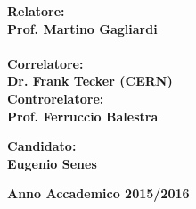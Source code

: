\begin{titlepage}
\noindent
\begin{minipage}[t]{0.47\textwidth}
{\large{\bf Relatore:\\
Prof. Martino Gagliardi}}\\
\vspace{4mm}
\\
{\large{\bf Correlatore:\\
Dr. Frank Tecker (CERN)}}
\vspace{8mm}
{\large{\bf \\ Controrelatore:\\
Prof. Ferruccio Balestra}}
\end{minipage}
\hfill
\begin{minipage}[t]{0.47\textwidth}\raggedleft
\vspace{16mm}
{\large{\bf Candidato:\\
Eugenio Senes}}
\end{minipage}
\vspace{9mm}
\begin{center}
{\large{\bf 
Anno Accademico 2015/2016}}
\end{center}

\end{titlepage}